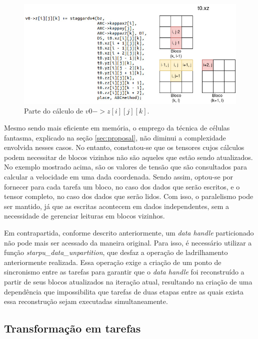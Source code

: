 \documentclass[cic,tc]{iiufrgs}
\begin{document}
\begin{figure}[!htb]
  \caption{Parte do cálculo de $v0->z[i][j][k]$.}
    \begin{center} 
      \includegraphics[width=32em]{neighborhood}
    \end{center}
    \label{fig:neighborhood}
\end{figure}

Mesmo sendo mais eficiente em memória, o emprego da técnica de células fantasma, explicado na seção \ref{sec:proposal}, não diminui
a complexidade envolvida nesses casos. No entanto, constatou-se que os tensores cujos cálculos podem necessitar de blocos vizinhos não são
aqueles que estão sendo atualizados. No exemplo mostrado acima, são os valores de tensão que são consultados para calcular a velocidade
em uma dada coordenada. Sendo assim, optou-se por fornecer para cada tarefa um bloco, no caso dos dados que serão escritos, e o tensor
completo, no caso dos dados que serão lidos. Com isso, o paralelismo pode ser mantido, já que as escritas acontecem em dados independentes,
sem a necessidade de gerenciar leituras em blocos vizinhos.

Em contrapartida, conforme descrito anteriormente, um \textit{data handle} particionado não pode mais ser acessado da maneira original. Para isso, é necessário
utilizar a função \textit{starpu\_data\_unpartition}, que desfaz a operação de ladrilhamento anteriormente realizada. Essa operação exige a criação de um ponto
de sincronismo entre as tarefas para garantir que o \textit{data handle} foi reconstruído a partir de seus blocos atualizados na iteração atual, resultando na
criação de uma dependência que impossibilita que tarefas de duas etapas entre as quais exista essa reconstrução sejam executadas simultaneamente.

\subsection{Transformação em tarefas}\label{sec:task}
\end{document}
